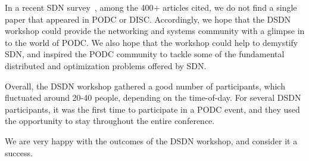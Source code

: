 \documentclass[11pt,pdftex,letter]{article}
\begin{document}
In a recent SDN survey~\cite{sdn-survey}, among the 400$+$ articles cited,
we do not find
a single paper that appeared in PODC or DISC.
Accordingly, we hope that the DSDN workshop could
provide the networking and systems community with a glimpse in to the
world of PODC. We also hope that the workshop could help to demystify
SDN, and inspired the PODC community
to tackle some of the fundamental distributed and
optimization problems offered by SDN.

Overall, the DSDN workshop gathered a good number of participants,
which
fluctuated around 20-40 people, depending on the time-of-day.
For several DSDN participants, it was the first time
to participate in a PODC event, and they used the opportunity
to stay throughout the entire conference.

We are very happy with the outcomes of the DSDN workshop, and consider it
a success.



\end{document}
